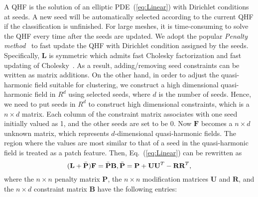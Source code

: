 \documentclass[10pt,journal,cspaper,compsoc]{IEEEtran}
\begin{document}
A QHF is the solution of an elliptic PDE~(\ref{eq:Linear}) with
Dirichlet conditions at seeds. A new seed will be automatically
selected according to the current QHF if the classification is
unfinished. For large meshes, it is time-consuming to solve the QHF
every time after the seeds are updated. We adopt the popular
\emph{Penalty method}~\cite{XZCX09} to fast update the QHF with
Dirichlet condition assigned by the seeds. Specifically, $\textbf{L}$
is symmetric which admits fast Cholesky factorization and fast
updating of Cholesky~\cite{DH06}. As a result, adding/removing
seed constraints can be written as matrix additions. On the other
hand, in order to adjust the quasi-harmonic field suitable for
clustering, we construct a high dimensional quasi-harmonic field in
$R^d$ using selected seeds, where $d$ is the number of seeds. Hence,
we need to put seeds in $R^d$ to construct high dimensional
constraints, which is a $n\times d$ matrix.  Each column of the
constraint matrix associates with one seed initially valued as 1, and
the other seeds are set to be 0. Now $\textbf{F}$ becomes a $n\times
d$ unknown matrix, which represents $d$-dimensional quasi-harmonic
fields. The region where the values are most similar to that of a seed
in the quasi-harmonic field is treated as a patch feature. Then,
Eq.~(\ref{eq:Linear}) can be rewritten as
\begin{equation}\label{eq:Penalty_function}
(\textbf{L} + \bar{\textbf{P}})\textbf{F} =
\bar{\textbf{P}}\textbf{B}, \\ \bar{\textbf{P}}=\textbf{P} +
\textbf{U}\textbf{U}^T - \textbf{R}\textbf{R}^T,
\end{equation}
where the $n\times n$ penalty matrix $\textbf{P}$, the $n\times n$
modification matrices $\textbf{U}$ and $\textbf{R}$, and the $n\times
d$ constraint matrix $\textbf{B}$ have the following entries:
\end{document}
